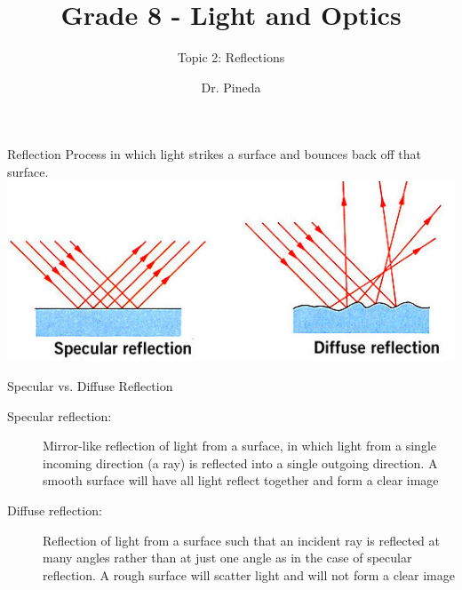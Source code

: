 \documentclass[t]{beamer}
\title[Topic 2]{Grade 8 - Light and Optics} %
\subtitle{Topic 2: Reflections}
\author{Dr. Pineda}
\institute[] {\href{http://www.drpineda.ca}{www.drpineda.ca}}
\date{} %
\begin{document}
{
\frame{\titlepage}
}


\begin{frame}{Reflection}
Process in which light strikes a surface and bounces back off that surface. 
\includegraphics[width=1\linewidth]{images/specularreflection.jpg}
\end{frame}

\begin{frame}{Specular vs. Diffuse Reflection}

\begin{description}
\item[Specular reflection:]  Mirror-like reflection of light from a surface, in which light from a single incoming direction (a ray) is reflected into a single outgoing direction. A smooth surface will have all light reflect together and form a clear image

\item[Diffuse reflection:]  Reflection of light from a surface such that an incident ray is reflected at many angles rather than at just one angle as in the case of specular reflection. A rough surface will scatter light and will not form a clear image
\end{description}
\end{frame}
\end{document}
